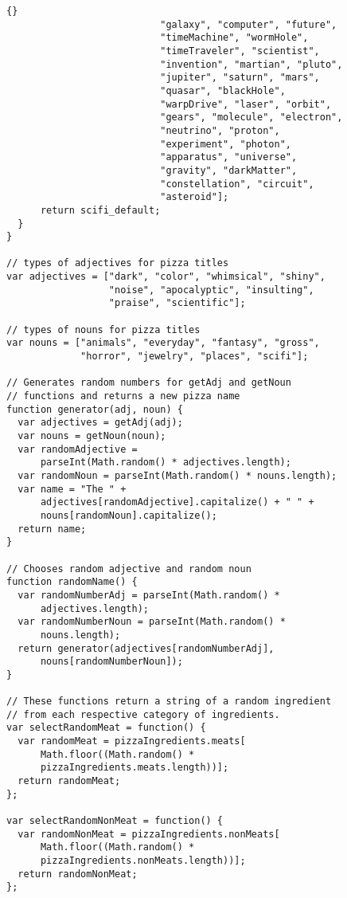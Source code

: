 \documentclass[twoside]{article}
\begin{document}
\begin{lstlisting}{}
                           "galaxy", "computer", "future",
                           "timeMachine", "wormHole",
                           "timeTraveler", "scientist",
                           "invention", "martian", "pluto",
                           "jupiter", "saturn", "mars",
                           "quasar", "blackHole",
                           "warpDrive", "laser", "orbit",
                           "gears", "molecule", "electron",
                           "neutrino", "proton",
                           "experiment", "photon",
                           "apparatus", "universe",
                           "gravity", "darkMatter",
                           "constellation", "circuit",
                           "asteroid"];
      return scifi_default;
  } 
}

// types of adjectives for pizza titles
var adjectives = ["dark", "color", "whimsical", "shiny",
                  "noise", "apocalyptic", "insulting",
                  "praise", "scientific"];

// types of nouns for pizza titles
var nouns = ["animals", "everyday", "fantasy", "gross",
             "horror", "jewelry", "places", "scifi"];

// Generates random numbers for getAdj and getNoun
// functions and returns a new pizza name
function generator(adj, noun) {
  var adjectives = getAdj(adj);
  var nouns = getNoun(noun);
  var randomAdjective = 
      parseInt(Math.random() * adjectives.length);
  var randomNoun = parseInt(Math.random() * nouns.length);
  var name = "The " + 
      adjectives[randomAdjective].capitalize() + " " +
      nouns[randomNoun].capitalize();
  return name;
}

// Chooses random adjective and random noun
function randomName() {
  var randomNumberAdj = parseInt(Math.random() * 
      adjectives.length);
  var randomNumberNoun = parseInt(Math.random() * 
      nouns.length);
  return generator(adjectives[randomNumberAdj], 
      nouns[randomNumberNoun]);
}

// These functions return a string of a random ingredient
// from each respective category of ingredients.
var selectRandomMeat = function() {
  var randomMeat = pizzaIngredients.meats[
      Math.floor((Math.random() * 
      pizzaIngredients.meats.length))];
  return randomMeat;
};

var selectRandomNonMeat = function() {
  var randomNonMeat = pizzaIngredients.nonMeats[
      Math.floor((Math.random() *
      pizzaIngredients.nonMeats.length))];
  return randomNonMeat;
};


\end{lstlisting}
\end{document}
